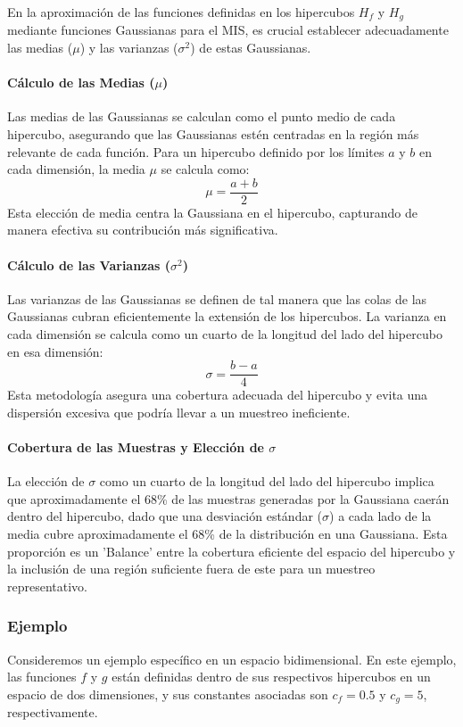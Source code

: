 \documentclass{article}
\begin{document}
En la aproximación de las funciones definidas en los hipercubos \( H_f \) y \( H_g \) mediante funciones Gaussianas para el MIS, es crucial establecer adecuadamente las medias (\( \mu \)) y las varianzas (\( \sigma^2 \)) de estas Gaussianas.

\paragraph{Cálculo de las Medias (\( \mu \))}
Las medias de las Gaussianas se calculan como el punto medio de cada hipercubo, asegurando que las Gaussianas estén centradas en la región más relevante de cada función. Para un hipercubo definido por los límites \( a \) y \( b \) en cada dimensión, la media \( \mu \) se calcula como:
$$
    \mu = \frac{a + b}{2}
$$
Esta elección de media centra la Gaussiana en el hipercubo, capturando de manera efectiva su contribución más significativa.

\paragraph{Cálculo de las Varianzas (\( \sigma^2 \))}
Las varianzas de las Gaussianas se definen de tal manera que las colas de las Gaussianas cubran eficientemente la extensión de los hipercubos. La varianza en cada dimensión se calcula como un cuarto de la longitud del lado del hipercubo en esa dimensión:
$$
    \sigma = \frac{b - a}{4}
$$
Esta metodología asegura una cobertura adecuada del hipercubo y evita una dispersión excesiva que podría llevar a un muestreo ineficiente.

\paragraph{Cobertura de las Muestras y Elección de \( \sigma \)}
La elección de \( \sigma \) como un cuarto de la longitud del lado del hipercubo implica que aproximadamente el 68\% de las muestras generadas por la Gaussiana caerán dentro del hipercubo, dado que una desviación estándar (\( \sigma \)) a cada lado de la media cubre aproximadamente el 68\% de la distribución en una Gaussiana. Esta proporción es un 'Balance' entre la cobertura eficiente del espacio del hipercubo y la inclusión de una región suficiente fuera de este para un muestreo representativo.

\subsubsection{Ejemplo}
Consideremos un ejemplo específico en un espacio bidimensional. En este ejemplo, las funciones \( f \) y \( g \) están definidas dentro de sus respectivos hipercubos en un espacio de dos dimensiones, y sus constantes asociadas son \( c_f = 0.5 \) y \( c_g = 5 \), respectivamente.
\end{document}
